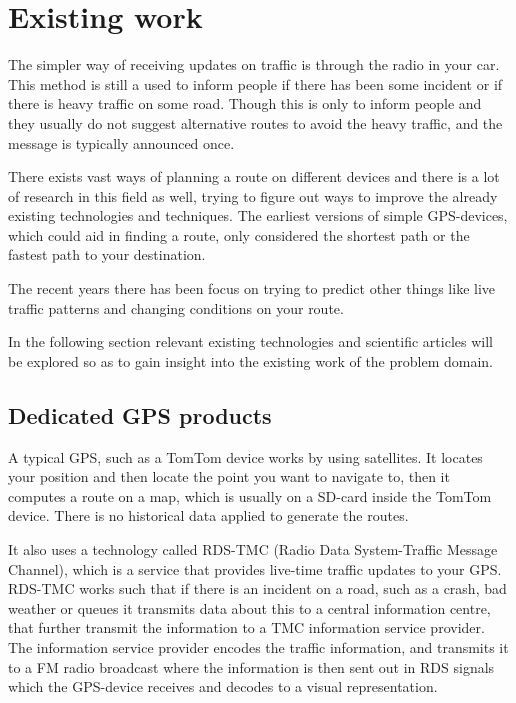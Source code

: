 \section{Existing work}
The simpler way of receiving updates on traffic is through the radio in your car. This method is still a used to inform people if there has been some incident or if there is heavy traffic on some road. Though this is only to inform people and they usually do not suggest alternative routes to avoid the heavy traffic, and the message is typically announced once.  

There exists vast ways of planning a route on different devices and there is  a lot of research in this field as well, trying to figure out ways to improve the already existing technologies and techniques. The earliest versions of simple GPS-devices, which could aid in finding a route, only considered the shortest path or the fastest path to your destination.

The recent years there has been focus on trying to predict other things like live traffic patterns and changing conditions on your route.

In the following section relevant existing technologies and scientific articles will be explored so as to gain insight into the existing work of the problem domain.

\subsection*{Dedicated GPS products}
A typical GPS, such as a TomTom device works by using satellites. It locates your position and then locate the point you want to navigate to, then it computes a route on a map, which is usually on a SD-card inside the TomTom device. There is no historical data applied to generate the routes.

It also uses a technology called RDS-TMC (Radio Data System-Traffic Message Channel), which is a service that provides live-time traffic updates to your GPS. RDS-TMC works such that if there is an incident on a road, such as a crash, bad weather or queues it transmits data about this to a central information centre, that further transmit the information to a TMC information service provider. The information service provider encodes the traffic information, and transmits it to a FM radio broadcast where the information is then sent out in RDS signals which the GPS-device receives and decodes to a visual representation.

